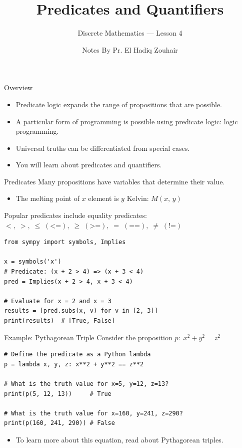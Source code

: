 \documentclass[aspectratio=169]{beamer}
\title{Predicates and Quantifiers}
\subtitle{Discrete Mathematics --- Lesson 4}
\author{Notes By Pr. El Hadiq Zouhair}
\date{}
\begin{document}
\begin{frame}
  \titlepage
\end{frame}

\begin{frame}{Overview}
  \begin{itemize}
    \item Predicate logic expands the range of propositions that are possible.
    \item A particular form of programming is possible using predicate logic:
          \textcolor{linkblue}{logic programming}.
    \item Universal truths can be differentiated from special cases.
    \item You will learn about predicates and quantifiers.
  \end{itemize}
\end{frame}

\begin{frame}[fragile]{Predicates}
  Many propositions have variables that determine their value.
  \begin{itemize}
    \item The melting point of $x$ element is $y$ Kelvin: $M(x,\,y)$
  \end{itemize}
  Popular predicates include equality predicates:
  $<,\;>,\;\leq\;(\texttt{<=}),\;\geq\;(\texttt{>=}),\;=\;(\texttt{==}),\;\neq\;(\texttt{!=})$

  \begin{lstlisting}[style=python]
from sympy import symbols, Implies

x = symbols('x')
# Predicate: (x + 2 > 4) => (x + 3 < 4)
pred = Implies(x + 2 > 4, x + 3 < 4)

# Evaluate for x = 2 and x = 3
results = [pred.subs(x, v) for v in [2, 3]]
print(results)  # [True, False]
  \end{lstlisting}
\end{frame}

\begin{frame}[fragile]{Example: Pythagorean Triple}
  Consider the proposition $p\colon\; x^{2} + y^{2} = z^{2}$

  \begin{lstlisting}[style=python]
# Define the predicate as a Python lambda
p = lambda x, y, z: x**2 + y**2 == z**2

# What is the truth value for x=5, y=12, z=13?
print(p(5, 12, 13))     # True

# What is the truth value for x=160, y=241, z=290?
print(p(160, 241, 290)) # False
  \end{lstlisting}

  \begin{itemize}
    \item To learn more about this equation, read about
          \textcolor{linkblue}{Pythagorean triples}.
  \end{itemize}
\end{frame}
\end{document}
